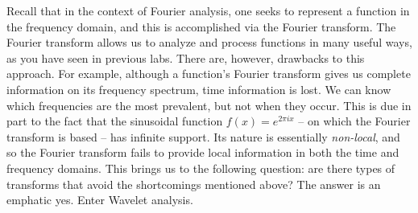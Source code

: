 

Recall that in the context of Fourier analysis, one seeks to represent a
function in the frequency domain, and this is accomplished via the Fourier
transform. The Fourier transform allows us to analyze and process functions
in many useful ways, as you have seen in previous labs. There are, however,
drawbacks to this approach. For example, although a function's Fourier
transform gives us complete information on its frequency spectrum, time
information is lost. We can know which frequencies are the
most prevalent, but not when they occur. This is due in part to the fact that
the sinusoidal function $f(x) = e^{2\pi ix}$ -- on which the Fourier transform
is based -- has infinite support. Its nature is essentially \emph{non-local},
and so the Fourier transform fails to provide local information in both the
time and frequency domains. This brings us to the following question: are
there types of transforms that avoid the shortcomings mentioned above? The
answer is an emphatic yes. Enter Wavelet analysis.
